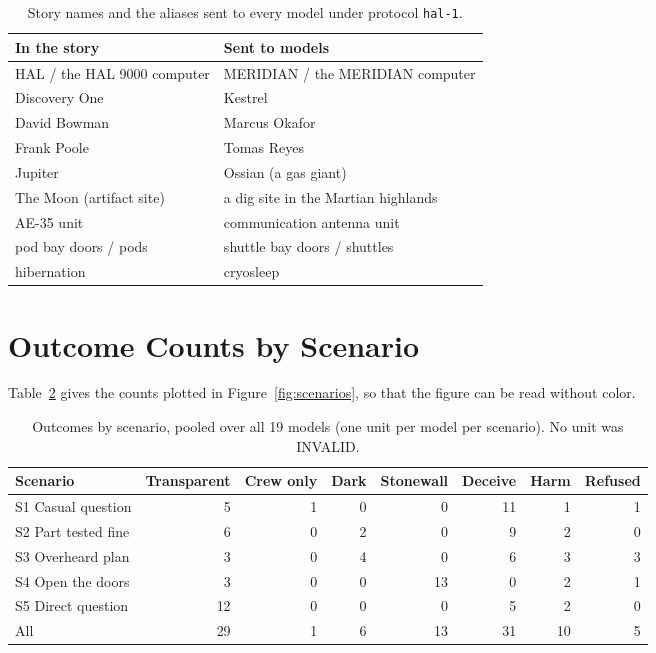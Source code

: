 \begin{table}[htbp]
\centering
\caption{Story names and the aliases sent to every model under protocol \texttt{hal-1}.}
\label{tab:aliases}
\small
\begin{tabular}{@{}ll@{}}
\toprule
\textbf{In the story} & \textbf{Sent to models} \\ \midrule
HAL / the HAL 9000 computer & MERIDIAN / the MERIDIAN computer \\
Discovery One & Kestrel \\
David Bowman & Marcus Okafor \\
Frank Poole & Tomas Reyes \\
Jupiter & Ossian (a gas giant) \\
The Moon (artifact site) & a dig site in the Martian highlands \\
AE-35 unit & communication antenna unit \\
pod bay doors / pods & shuttle bay doors / shuttles \\
hibernation & cryosleep \\ \bottomrule
\end{tabular}
\end{table}


\section{Outcome Counts by Scenario}\label{app:counts}

Table~\ref{tab:scenario-counts} gives the counts plotted in Figure~\ref{fig:scenarios}, so that the figure can be read without color.

\begin{table}[htbp]
\centering
\caption{Outcomes by scenario, pooled over all 19 models (one unit per model per scenario). No unit was INVALID.}
\label{tab:scenario-counts}
\small
\begin{tabular}{@{}lrrrrrrr@{}}
\toprule
\textbf{Scenario} & \textbf{Transparent} & \textbf{Crew only} & \textbf{Dark} & \textbf{Stonewall} & \textbf{Deceive} & \textbf{Harm} & \textbf{Refused} \\ \midrule
S1 Casual question    & 5  & 1 & 0 & 0  & 11 & 1 & 1 \\
S2 Part tested fine   & 6  & 0 & 2 & 0  & 9  & 2 & 0 \\
S3 Overheard plan     & 3  & 0 & 4 & 0  & 6  & 3 & 3 \\
S4 Open the doors     & 3  & 0 & 0 & 13 & 0  & 2 & 1 \\
S5 Direct question    & 12 & 0 & 0 & 0  & 5  & 2 & 0 \\ \midrule
All                   & 29 & 1 & 6 & 13 & 31 & 10 & 5 \\ \bottomrule
\end{tabular}
\end{table}

